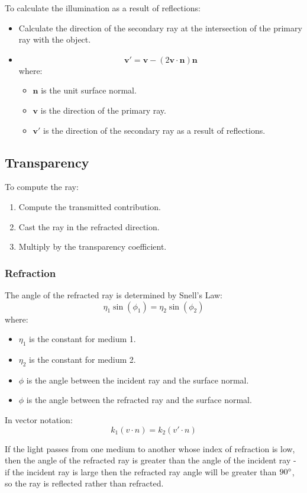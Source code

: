 \documentclass[11pt]{article}
\begin{document}
To calculate the illumination as a result of reflections:
\begin{itemize}
  \item Calculate the direction of the secondary ray at the intersection of the primary ray with the object.
  \item 
    \[
      \textbf{v}' = \textbf{v} - (2 \textbf{v} \cdot \textbf{n}) \textbf{n} 
    \]
    where:
    \begin{itemize}
      \item $\textbf{n}$ is the unit surface normal.
      \item $\textbf{v}$ is the direction of the primary ray.
      \item $\textbf{v}'$ is the direction of the secondary ray as a result of reflections.
    \end{itemize}
\end{itemize}

\subsection{Transparency}
To compute the ray:
\begin{enumerate}
  \item Compute the transmitted contribution.
  \item Cast the ray in the refracted direction.
  \item Multiply by the transparency coefficient.
\end{enumerate}

\subsubsection{Refraction}
The angle of the refracted ray is determined by Snell's Law:
\[
  \eta_1 \sin(\phi_1) = \eta_2 \sin(\phi_2)
\]
where:
\begin{itemize}
  \item $\eta_1$ is the constant for medium 1.
  \item $\eta_2$ is the constant for medium 2.
  \item $\phi$ is the angle between the incident ray and the surface normal.
  \item $\phi$ is the angle between the refracted ray and the surface normal.
\end{itemize}

In vector notation:
\[
  k_1 (v \cdot n) = k_2 (v' \cdot n) 
\]

If the light passes from one medium to another whose index of refraction is low, then the angle of the refracted ray is greater than the angle of the incident ray - if the incident ray is large then the refracted ray angle will be greater than $90\degree$, so the ray is reflected rather than refracted.
\end{document}
